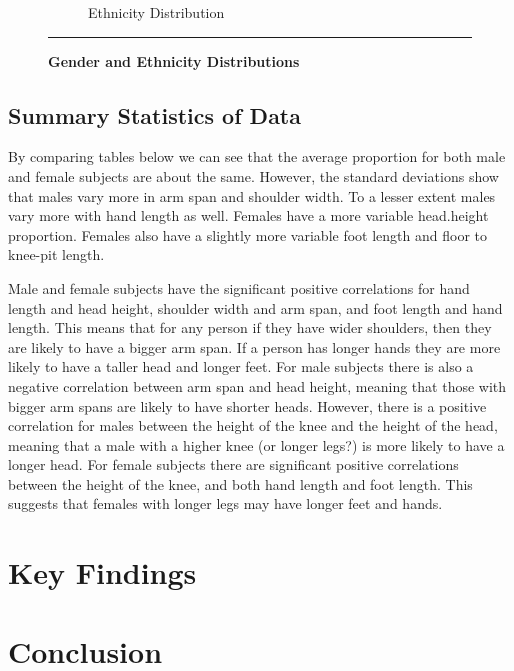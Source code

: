 \documentclass[]{article}
\begin{document}
\begin{figure}[!ht]
\begin{subfigure}[h]{0.5\textwidth}
            \caption{Ethnicity Distribution}
        \label{fig:ethnicity-plot}
    \end{subfigure}
    \vspace{2.5mm}
    \hrule
    \vspace{2.5mm}
        \caption{\textbf{ Gender and Ethnicity Distributions } }
        \label{fig:ge-plot}
\end{figure}

\newpage
\subsection{Summary Statistics of Data}
\label{sec:data-summary}

By comparing tables below we can see that the average proportion for
both male and female subjects are about the same. However, the standard
deviations show that males vary more in arm span and shoulder width. To
a lesser extent males vary more with hand length as well. Females have a
more variable head.height proportion. Females also have a slightly more
variable foot length and floor to knee-pit length.




Male and female subjects have the significant positive correlations for
hand length and head height, shoulder width and arm span, and foot
length and hand length. This means that for any person if they have
wider shoulders, then they are likely to have a bigger arm span. If a
person has longer hands they are more likely to have a taller head and
longer feet. For male subjects there is also a negative correlation
between arm span and head height, meaning that those with bigger arm
spans are likely to have shorter heads. However, there is a positive
correlation for males between the height of the knee and the height of
the head, meaning that a male with a higher knee (or longer legs?) is
more likely to have a longer head. For female subjects there are
significant positive correlations between the height of the knee, and
both hand length and foot length. This suggests that females with longer
legs may have longer feet and hands.

\newpage

\section{Key Findings}
\label{sec:findings}

\section{Conclusion}
\label{sec:conclusion}
\end{document}
